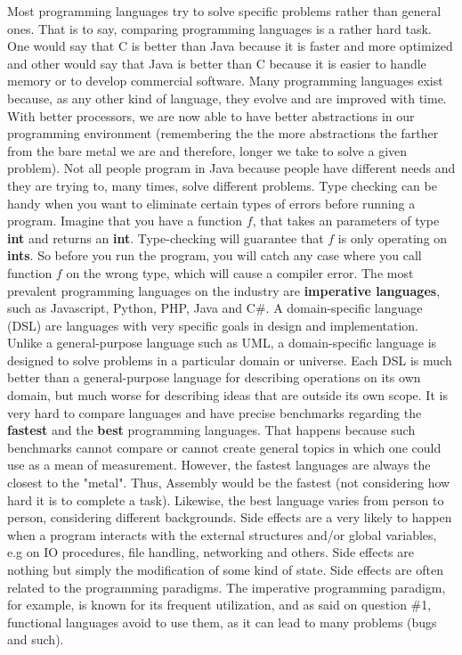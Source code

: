 \documentclass[conference]{IEEEtran}
\begin{document}
Most programming languages try to solve specific problems rather than general ones. That is to say, comparing programming languages is a rather hard task. One would say that C is better than Java because it is faster and more optimized and other would say that Java is better than C because it is easier to handle memory or to develop commercial software. Many programming languages exist because, as any other kind of language, they evolve and are improved with time. With better processors, we are now able to have better abstractions in our programming environment (remembering the the more abstractions the farther from the bare metal we are and therefore, longer we take to solve a given problem). Not all people program in Java because people have different needs and they are trying to, many times, solve different problems.
Type checking can be handy when you want to eliminate certain types of errors before running a program. 
Imagine that you have a function $f$, that takes an parameters of type \textbf{int} and returns an \textbf{int}. Type-checking will guarantee that $f$ is only operating on \textbf{ints}. So before you run the program, you will catch any case where you call function $f$ on the wrong type, which will cause a compiler error.
The most prevalent programming languages on the industry are \textbf{imperative languages}, such as Javascript, Python, PHP, Java and C\#.
A domain-specific language (DSL) are languages with very specific goals in design and implementation. Unlike a general-purpose language such as UML, a domain-specific language is designed to solve problems in a particular domain or universe. Each DSL is much better than a general-purpose language for describing operations on its own domain, but much worse for describing ideas that are outside its own scope.
It is very hard to compare languages and have precise benchmarks regarding the \textbf{fastest} and the \textbf{best} programming languages. That happens because such benchmarks cannot compare or cannot create general topics in which one could use as a mean of measurement. However, the fastest languages are always the closest to the "metal". Thus, Assembly would be the fastest (not considering how hard it is to complete a task). Likewise, the best language varies from person to person, considering different backgrounds.
Side effects are a very likely to happen when a program interacts with the external structures and/or global variables, e.g on IO procedures, file handling, networking and others. Side effects are nothing but simply the modification of some kind of state. Side effects are often related to the programming paradigms. The imperative programming paradigm, for example, is known for its frequent utilization, and as said on question \#1, functional languages avoid to use them, as it can lead to many problems (bugs and such).
\end{document}
